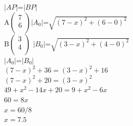\documentclass[journal,10pt,twocolumn]{article}
\begin{document}
	$|AP|$=$|BP|$\\   \vspace{3mm}
A$\begin{pmatrix}
  7 \\
  6 \\
 \end{pmatrix}$$|A_0|$=$\sqrt{(7-x)^2+(6-0)^2}$\\     \vspace{3mm}
B$\begin{pmatrix}
  3 \\
  4 \\
 \end{pmatrix}$ $|B_0|$=$\sqrt{(3-x)^2+(4-0)^2}$\\      \vspace{3mm}
$|A_0|$=$|B_0|$\\             \vspace{2mm}                 
$(7-x)^2+36=(3-x)^2+16$\\      \vspace{2mm}                
$(7-x)^2+20=(3-x)^2$\\           \vspace{2mm}              
$49+x^2-14x+20=9+x^2-6x$\\         \vspace{2mm}            
$60=8x$\\                            \vspace{2mm}          
$x=60/8$\\                           \vspace{2mm}          
$x=7.5$                  			
\end{document}
